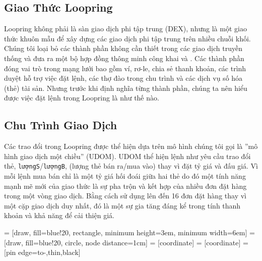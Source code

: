 \documentclass{article}
\makeatletter
\newenvironment{figurehere}
 {\def\@captype{figure}}
 {}
\makeatother
\begin{document}
\begin{multicols}{2}
\section{Giao Thức Loopring\label{sec:loopring_protocol}}
Loopring không phải là sàn giao dịch phi tập trung (DEX), nhưng là một giao thức khuôn mẫu để xây dựng các giao dịch phi tập trung trên nhiều chuỗi khối. Chúng tôi loại bỏ các thành phần không cần thiết trong các giao dịch truyền thống và đưa ra một bộ hợp đồng thông minh công khai và . Các thành phần đóng vai trò trong mạng lưới bao gồm ví, rơ-le, chia sẻ thanh khoản, các trình duyệt hỗ trợ việc đặt lệnh, các thợ đào trong chu trình và các dịch vụ số hóa (thẻ) tài sản. Nhưng trước khi định nghĩa từng thành phần, chúng ta nên hiểu được việc đặt lệnh trong Loopring là như thế nào. 

\subsection{Chu Trình Giao Dịch\label{sec:order_ring}}
Các trao đổi trong Loopring được thể hiện dựa trên mô hình chúng tôi gọi là ”mô hình giao dịch một chiều” (UDOM)\cite{coinport2014udom}. UDOM thể hiện lệnh như yêu cầu trao đổi thẻ, \verb|lượngS|/\verb|lượngB|, (lượng thẻ bán ra/mua vào) thay vì đặt tỷ giá và đấu giá. Vì mỗi lệnh mua bán chỉ là một tỷ giá hối đoái giữa hai thẻ do đó một tính năng mạnh mẽ mới của giao thức là sự pha trộn và kết hợp của nhiều đơn đặt hàng trong một vòng giao dịch. Bằng cách sử dụng lên đến 16 đơn đặt hàng thay vì một cặp giao dịch duy nhất, đó là một sự gia tăng đáng kể trong tính thanh khoản và khả năng để cải thiện giá. 

\begin{center}
\begin{figurehere}
\centering
{} = [draw, fill=blue!20, rectangle, 
    minimum height=3em, minimum width=6em]
 = [draw, fill=blue!20, circle, node distance=1cm]
 = [coordinate]
 = [coordinate]
 = [pin edge={to-,thin,black}]

\end{figurehere}
\end{center}
\end{multicols}
\end{document}
